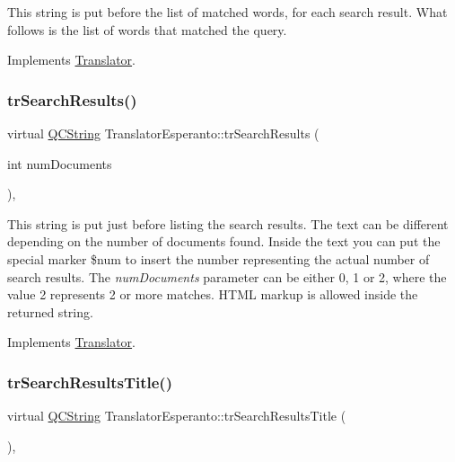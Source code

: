 This string is put before the list of matched words, for each search result. What follows is the list of words that matched the query. 

Implements \mbox{\hyperlink{class_translator}{Translator}}.

\mbox{\label{class_translator_esperanto_a440bac7fb317541f7b17690c3734011c}} 
\subsubsection{\texorpdfstring{trSearchResults()}{trSearchResults()}}
{\footnotesize\ttfamily virtual \mbox{\hyperlink{class_q_c_string}{Q\+C\+String}} Translator\+Esperanto\+::tr\+Search\+Results (\begin{DoxyParamCaption}\item[{int}]{num\+Documents }\end{DoxyParamCaption})\hspace{0.3cm}{\ttfamily [inline]}, {\ttfamily [virtual]}}

This string is put just before listing the search results. The text can be different depending on the number of documents found. Inside the text you can put the special marker \$num to insert the number representing the actual number of search results. The {\itshape num\+Documents} parameter can be either 0, 1 or 2, where the value 2 represents 2 or more matches. H\+T\+ML markup is allowed inside the returned string. 

Implements \mbox{\hyperlink{class_translator}{Translator}}.

\mbox{\label{class_translator_esperanto_adbb5abac3a003e01ccf7aecbaf1d5a0d}} 
\subsubsection{\texorpdfstring{trSearchResultsTitle()}{trSearchResultsTitle()}}
{\footnotesize\ttfamily virtual \mbox{\hyperlink{class_q_c_string}{Q\+C\+String}} Translator\+Esperanto\+::tr\+Search\+Results\+Title (\begin{DoxyParamCaption}{ }\end{DoxyParamCaption})\hspace{0.3cm}{\ttfamily [inline]}, {\ttfamily [virtual]}}

